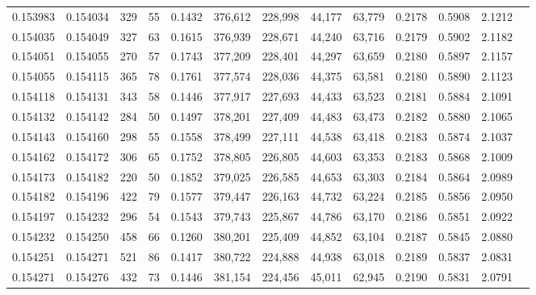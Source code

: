 \begin{tabular}{rrrrrrrrrrrrr}
0.153983 & 0.154034 &   329 &  55 &                                     0.1432 & 376,612 & 228,998 &  44,177 &  63,779 & 0.2178 & 0.5908 & 2.1212 \\
0.154035 & 0.154049 &   327 &  63 &                                     0.1615 & 376,939 & 228,671 &  44,240 &  63,716 & 0.2179 & 0.5902 & 2.1182 \\
0.154051 & 0.154055 &   270 &  57 &                                     0.1743 & 377,209 & 228,401 &  44,297 &  63,659 & 0.2180 & 0.5897 & 2.1157 \\
0.154055 & 0.154115 &   365 &  78 &                                     0.1761 & 377,574 & 228,036 &  44,375 &  63,581 & 0.2180 & 0.5890 & 2.1123 \\
0.154118 & 0.154131 &   343 &  58 &                                     0.1446 & 377,917 & 227,693 &  44,433 &  63,523 & 0.2181 & 0.5884 & 2.1091 \\
0.154132 & 0.154142 &   284 &  50 &                                     0.1497 & 378,201 & 227,409 &  44,483 &  63,473 & 0.2182 & 0.5880 & 2.1065 \\
0.154143 & 0.154160 &   298 &  55 &                                     0.1558 & 378,499 & 227,111 &  44,538 &  63,418 & 0.2183 & 0.5874 & 2.1037 \\
0.154162 & 0.154172 &   306 &  65 &                                     0.1752 & 378,805 & 226,805 &  44,603 &  63,353 & 0.2183 & 0.5868 & 2.1009 \\
0.154173 & 0.154182 &   220 &  50 &                                     0.1852 & 379,025 & 226,585 &  44,653 &  63,303 & 0.2184 & 0.5864 & 2.0989 \\
0.154182 & 0.154196 &   422 &  79 &                                     0.1577 & 379,447 & 226,163 &  44,732 &  63,224 & 0.2185 & 0.5856 & 2.0950 \\
0.154197 & 0.154232 &   296 &  54 &                                     0.1543 & 379,743 & 225,867 &  44,786 &  63,170 & 0.2186 & 0.5851 & 2.0922 \\
0.154232 & 0.154250 &   458 &  66 &                                     0.1260 & 380,201 & 225,409 &  44,852 &  63,104 & 0.2187 & 0.5845 & 2.0880 \\
0.154251 & 0.154271 &   521 &  86 &                                     0.1417 & 380,722 & 224,888 &  44,938 &  63,018 & 0.2189 & 0.5837 & 2.0831 \\
0.154271 & 0.154276 &   432 &  73 &                                     0.1446 & 381,154 & 224,456 &  45,011 &  62,945 & 0.2190 & 0.5831 & 2.0791 \\

\end{tabular}
